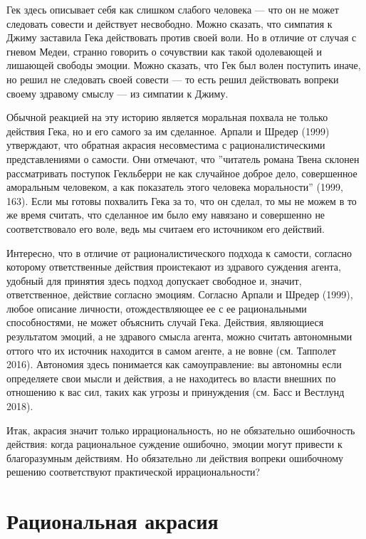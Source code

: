 \documentclass[11pt]{book}
\begin{document}
Гек здесь описывает себя как слишком слабого человека --- что он не может следовать совести и действует несвободно. Можно сказать, что симпатия к Джиму заставила Гека действовать против своей воли. Но в отличие от случая с гневом Медеи, странно говорить о сочувствии как такой одолевающей и лишающей свободы эмоции. Можно сказать, что Гек был волен поступить иначе, но решил не следовать своей совести --- то есть решил действовать вопреки своему здравому смыслу --- из симпатии к Джиму.

Обычной реакцией на эту историю является моральная похвала не только действия Гека, но и его самого за им сделанное. Арпали и Шредер (1999) утверждают, что обратная акрасия несовместима с рационалистическими представлениями о самости. Они отмечают, что ''читатель романа Твена склонен рассматривать поступок Гекльберри не как случайное доброе дело, совершенное аморальным человеком, а как показатель этого человека моральности'' (1999, 163). Если мы готовы похвалить Гека за то, что он сделал, то мы не можем в то же время считать, что сделанное им было ему навязано и совершенно не соответствовало его воле, ведь мы считаем его источником его действий.

Интересно, что в отличие от рационалистического подхода к самости, согласно которому ответственные действия проистекают из здравого суждения агента, удобный для принятия здесь подход допускает свободное и, значит, ответственное, действие согласно эмоциям. Согласно Арпали и Шредер (1999), любое описание личности, отождествляющее ее с ее рациональными способностями, не может объяснить случай Гека. Действия, являющиеся результатом эмоций, а не здравого смысла агента, можно считать автономными оттого что их источник находится в самом агенте, а не вовне (см. Тапполет 2016). Автономия здесь понимается как самоуправление: вы автономны если определяете свои мысли и действия, а не находитесь во власти внешних по отношению к вас сил, таких как угрозы и принуждения (см. Басс и Вестлунд 2018).

Итак, акрасия значит только иррациональность, но не обязательно ошибочность действия: когда рациональное суждение ошибочно, эмоции могут привести к благоразумным действиям. Но обязательно ли действия вопреки ошибочному решению соответствуют практической иррациональности?

\section{Рациональная акрасия}
\end{document}
